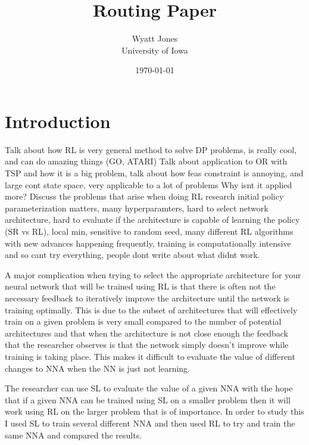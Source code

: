 \documentclass[12pt]{article}
\title{Routing Paper}
\author{Wyatt Jones\\University of Iowa}
\date{\today}
\begin{document}
\maketitle


\section{Introduction}
\label{intro}

Talk about how RL is very general method to solve DP problems, is really cool, and can do amazing things (GO, ATARI)
Talk about application to OR with TSP and how it is a big problem, talk about how feas constraint is annoying, and large cont state space, very applicable to a lot of problems
Why isnt it applied more?
Discuss the problems that arise when doing RL research initial policy parameterization matters, many hyperparamters, hard to select network architecture, hard to evaluate if the architecture is capable of learning the policy (SR vs RL), local min, sensitive to random seed, many different RL algorithms with new advances happening frequently, training is computationally intensive and so cant try everything, people dont write about what didnt work.

A major complication when trying to select the appropriate architecture for your neural network that will be trained using RL is that there is often not the necessary feedback to iteratively improve the architecture until the network is training optimally. This is due to the subset of architectures that will effectively train on a given problem is very small compared to the number of potential architectures and that when the architecture is not close enough the feedback that the researcher observes is that the network simply doesn't improve while training is taking place. This makes it difficult to evaluate the value of different changes to NNA when the NN is just not learning.

The researcher can use SL to evaluate the value of a given NNA with the hope that if a given NNA can be trained using SL on a smaller problem then it will work using RL on the larger problem that is of importance. In order to study this I used SL to train several different NNA and then used RL to try and train the same NNA and compared the results.



\end{document}
